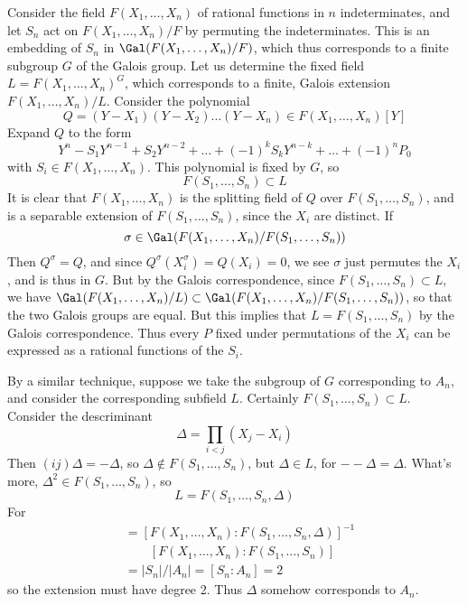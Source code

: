\begin{example}
    Consider the field $F(X_1, \dots, X_n)$ of rational functions in $n$ indeterminates, and let $S_n$ act on $F(X_1, \dots, X_n)/F$ by permuting the indeterminates. This is an embedding of $S_n$ in $\Gal(F(X_1, \dots, X_n)/F)$, which thus corresponds to a finite subgroup $G$ of the Galois group. Let us determine the fixed field $L = F(X_1, \dots, X_n)^G$, which corresponds to a finite, Galois extension $F(X_1, \dots, X_n)/L$. Consider the polynomial
    \[ Q = (Y - X_1) (Y - X_2) \dots (Y - X_n) \in F(X_1, \dots, X_n)[Y] \]
    Expand $Q$ to the form
    \[ Y^n - S_1 Y^{n-1} + S_2 Y^{n-2} + \dots + (-1)^k S_k Y^{n-k} + \dots + (-1)^n P_0 \]
    with $S_i \in F(X_1, \dots, X_n)$. This polynomial is fixed by $G$, so
    \[ F(S_1, \dots, S_n) \subset L \]
    It is clear that $F(X_1, \dots, X_n)$ is the splitting field of $Q$ over $F(S_1, \dots, S_n)$, and is a separable extension of $F(S_1, \dots, S_n)$, since the $X_i$ are distinct. If
    \[ \sigma \in \Gal(F(X_1, \dots, X_n)/F(S_1, \dots, S_n)) \]
    Then $Q^\sigma = Q$, and since $Q^\sigma(X_i^\sigma) = Q(X_i) = 0$, we see $\sigma$ just permutes the $X_i$, and is thus in $G$. But by the Galois correspondence, since $F(S_1, \dots, S_n) \subset L$, we have $\Gal(F(X_1, \dots, X_n)/L) \subset \Gal(F(X_1, \dots, X_n)/F(S_1, \dots, S_n))$, so that the two Galois groups are equal. But this implies that $L = F(S_1, \dots, S_n)$ by the Galois correspondence. Thus every $P$ fixed under permutations of the $X_i$ can be expressed as a rational functions of the $S_i$.

    By a similar technique, suppose we take the subgroup of $G$ corresponding to $A_n$, and consider the corresponding subfield $L$. Certainly $F(S_1, \dots, S_n) \subset L$. Consider the descriminant
    \[ \Delta = \prod_{i < j} (X_j - X_i) \]
    Then $(i j) \Delta = - \Delta$, so $\Delta \not \in F(S_1, \dots, S_n)$, but $\Delta \in L$, for $-- \Delta = \Delta$. What's more, $\Delta^2 \in F(S_1, \dots, S_n)$, so
    \[ L = F(S_1, \dots, S_n, \Delta) \]
    For
    \begin{align*}
        [ F(S_1, \dots, S_n, \Delta): F(S_1, \dots, S_n)] &= [F(X_1, \dots, X_n): F(S_1, \dots, S_n, \Delta)]^{-1}\\
        &\ \ \ \ \ \ \ \ \ [F(X_1, \dots, X_n): F(S_1, \dots, S_n)]\\
        &= |S_n|/|A_n| = [S_n: A_n] = 2
    \end{align*}
    so the extension must have degree 2. Thus $\Delta$ somehow corresponds to $A_n$.
\end{example}

